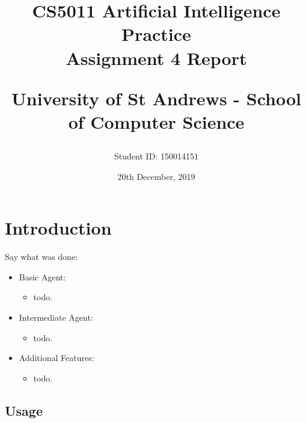 \documentclass[letterpaper,12pt]{article}
\begin{document}
\title{
    CS5011 Artificial Intelligence Practice\\Assignment 4 Report\\
    \begin{large}
    University of St Andrews - School of Computer Science
    \end{large}
}
\author{Student ID: 150014151}
\date{20th December, 2019}
\maketitle
\newpage

\tableofcontents
\newpage



\section{Introduction}
\label{sec:introduction}

Say what was done:

\begin{itemize}
    \item Basic Agent:
    \begin{itemize}
        \item todo.
    \end{itemize}
    \item Intermediate Agent:
    \begin{itemize}
        \item todo.
    \end{itemize}
    \item Additional Features:
    \begin{itemize}
        \item todo.
    \end{itemize}
        
\end{itemize}

\subsection{Usage}
\end{document}
